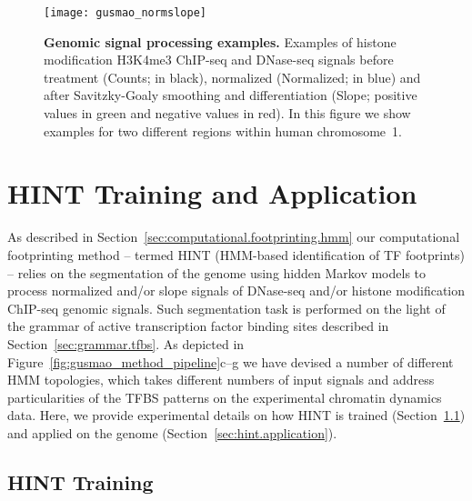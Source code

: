 \begin{figure}[h!]
\centering
\texttt{[image: gusmao\_normslope]}
\caption[Genomic signal processing examples]{\textbf{Genomic signal processing examples.} Examples of histone modification H3K4me3 ChIP-seq and DNase-seq signals before treatment (Counts; in black), normalized (Normalized; in blue) and after Savitzky-Goaly smoothing and differentiation (Slope; positive values in green and negative values in red). In this figure we show examples for two different regions within human chromosome~1.}
\label{fig:gusmao_normslope}
\end{figure}









\section{HINT Training and Application}
\label{sec:hint.training.application}

As described in Section~\ref{sec:computational.footprinting.hmm} our computational footprinting method -- termed HINT (HMM-based identification of TF footprints) -- relies on the segmentation of the genome using hidden Markov models to process normalized and/or slope signals of DNase-seq and/or histone modification ChIP-seq genomic signals. Such segmentation task is performed on the light of the grammar of active transcription factor binding sites described in Section~\ref{sec:grammar.tfbs}. As depicted in Figure~\ref{fig:gusmao_method_pipeline}c--g we have devised a number of different HMM topologies, which takes different numbers of input signals and address particularities of the TFBS patterns on the experimental chromatin dynamics data. Here, we provide experimental details on how HINT is trained (Section~\ref{sec:hint.training}) and applied on the genome (Section~\ref{sec:hint.application}).

\subsection{HINT Training}
\label{sec:hint.training}

